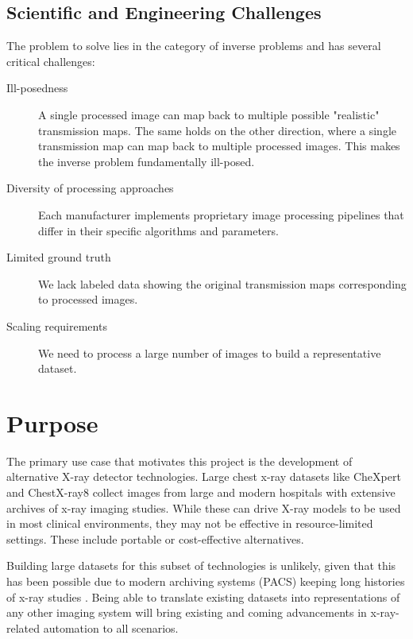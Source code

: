 \documentclass[nomenclature, english, bibtex]{kththesis}
\numberwithin{listing}{chapter}
\begin{document}
\subsection{Scientific and Engineering Challenges}

The problem to solve lies in the category of inverse problems and has several critical challenges:

\begin{description}
    \item[Ill-posedness]
        A single processed image can map back to multiple possible "realistic" transmission maps.
        The same holds on the other direction, where a single transmission map can map back to multiple processed images.
       This makes the inverse problem fundamentally ill-posed.
    \item[Diversity of processing approaches]
        Each manufacturer implements proprietary image processing pipelines that differ in their specific algorithms and parameters.
    \item[Limited ground truth] We lack labeled data showing the original transmission maps corresponding to processed images.
    \item[Scaling requirements] We need to process a large number of images to build a representative dataset.
\end{description}

\section{Purpose}

The primary use case that motivates this project is the development of alternative X-ray detector technologies.
Large chest x-ray datasets like CheXpert \cite{chexpert} and ChestX-ray8 \cite{nih} collect images from large
and modern hospitals with extensive archives of x-ray imaging studies. While these can drive X-ray models to be
used in most clinical environments, they may not be effective in resource-limited settings. These include portable
or cost-effective alternatives.

Building large datasets for this subset of technologies is unlikely, given that this has been possible due to
modern archiving systems (PACS) keeping long histories of x-ray studies \cite[p.~3462]{nih}. Being able
to translate existing datasets into representations of any other imaging system will bring existing and
coming advancements in x-ray-related automation to all scenarios.
\end{document}
